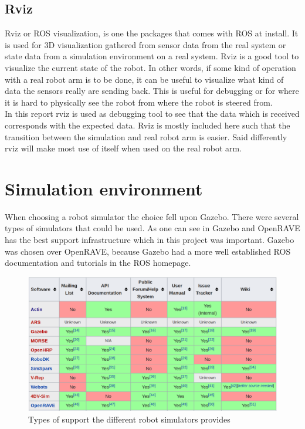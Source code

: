 \subsection{Rviz}
Rviz or ROS visualization, is one the packages that comes with ROS at install. It is used for 3D visualization gathered from sensor data from the real system or state data from a simulation environment on a real system. Rviz is a good tool to visualize the current state of the robot. In other words, if some kind of operation with a real robot arm is to be done, it can be useful to visualize what kind of data the sensors really are sending back. This is useful for debugging or for where it is hard to physically see the robot from where the robot is steered from.\\
In this report rviz is used as debugging tool to see that the data which is received corresponds with the expected data. Rviz is mostly included here such that the transition between the simulation and real robot arm is easier. Said differently rviz will make most use of itself when used on the real robot arm\cite{ROSWiki}. 

\section{Simulation environment}
When choosing a robot simulator the choice fell upon Gazebo. There were several types of simulators that could be used. As one can see in  Gazebo and OpenRAVE has the best support infrastructure which in this project was important\cite{wikiRobSim}. Gazebo was chosen over OpenRAVE, because Gazebo had a more well established ROS documentation and tutorials in the ROS homepage\cite{ROS}.
\begin{figure}[bpth]
  \centering
  \includegraphics[width=.9\textwidth]{img/WikipTableRobSim.png}
  \caption[Types of support the different robot simulators provides]{Types of support the different robot simulators provides\cite{wikiRobSim}}
  \label{fig:infra}
\end{figure}

